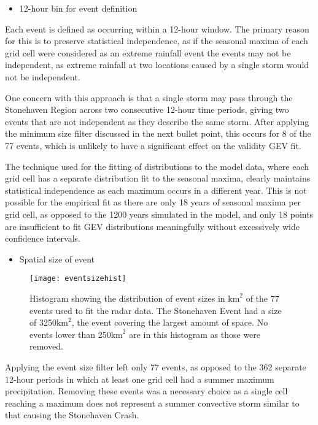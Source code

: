 \begin{itemize}\item 12-hour bin for event definition\end{itemize}

Each event is defined as occurring within a 12-hour window.
The primary reason for this is to preserve statistical independence,
    as if the seasonal maxima of each grid cell were considered as an extreme rainfall event
    the events may not be independent,
    as extreme rainfall at two locations caused by a single storm would not be independent.

One concern with this approach is that a single storm may pass through the Stonehaven Region
    across two consecutive 12-hour time periods,
    giving two events that are not independent as they describe the same storm.
After applying the minimum size filter discussed in the next bullet point,
    this occurs for 8 of the 77 events,
    which is unlikely to have a significant effect on the validity GEV fit.

The technique used for the fitting of distributions to the model data,
    where each grid cell has a separate distribution fit to the seasonal maxima,
    clearly maintains statistical independence as each maximum occurs in a different year.
This is not possible for the empirical fit as there are only 18 years of seasonal maxima per grid cell,
    as opposed to the 1200 years simulated in the model,
    and only 18 points are insufficient to fit GEV distributions meaningfully without excessively wide confidence intervals.

\begin{itemize}\item Spatial size of event\end{itemize}

\begin{figure}[H]
    \centering
    \texttt{[image: eventsizehist]}
    \caption[Histogram showing the distribution of event sizes.]{
        Histogram showing the distribution of event sizes in $\text{km}^2$ of the 77 events used to fit the radar data.
    The Stonehaven Event had a size of 3250$\text{km}^2$,
        the event covering the largest amount of space.
    No events lower than 250$\text{km}^2$ are in this histogram as those were removed.}
    \label{fig:eventsizehist}
\end{figure}

Applying the event size filter left only 77 events, as opposed to the 362 separate 12-hour periods in which at least one grid cell had a summer maximum precipitation.
Removing these events was a necessary choice as a single cell reaching a maximum does not represent a summer convective storm similar to that causing the Stonehaven Crash.

